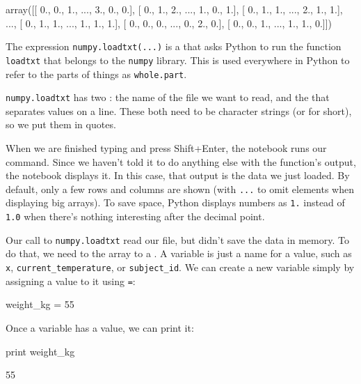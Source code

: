 \begin{VerbOut}
array([[ 0.,  0.,  1., ...,  3.,  0.,  0.],
       [ 0.,  1.,  2., ...,  1.,  0.,  1.],
       [ 0.,  1.,  1., ...,  2.,  1.,  1.],
       ...,
       [ 0.,  1.,  1., ...,  1.,  1.,  1.],
       [ 0.,  0.,  0., ...,  0.,  2.,  0.],
       [ 0.,  0.,  1., ...,  1.,  1.,  0.]])
\end{VerbOut}

The expression \texttt{numpy.loadtxt(...)} is a
 that asks Python to run the
function \texttt{loadtxt} that belongs to the \texttt{numpy} library.
This  is used everywhere in
Python to refer to the parts of things as \texttt{whole.part}.

\texttt{numpy.loadtxt} has two : the
name of the file we want to read, and the
 that separates values on a line. These
both need to be character strings (or  for
short), so we put them in quotes.

When we are finished typing and press Shift+Enter, the notebook runs our
command. Since we haven't told it to do anything else with the
function's output, the notebook displays it. In this case, that output
is the data we just loaded. By default, only a few rows and columns are
shown (with \texttt{...} to omit elements when displaying big arrays).
To save space, Python displays numbers as \texttt{1.} instead of
\texttt{1.0} when there's nothing interesting after the decimal point.

Our call to \texttt{numpy.loadtxt} read our file, but didn't save the
data in memory. To do that, we need to 
the array to a . A variable is just a
name for a value, such as \texttt{x}, \texttt{current\_temperature}, or
\texttt{subject\_id}. We can create a new variable simply by assigning a
value to it using \texttt{=}:

\begin{VerbIn}
weight_kg = 55
\end{VerbIn}

Once a variable has a value, we can print it:

\begin{VerbIn}
print weight_kg
\end{VerbIn}

\begin{VerbOut}
55
\end{VerbOut}

